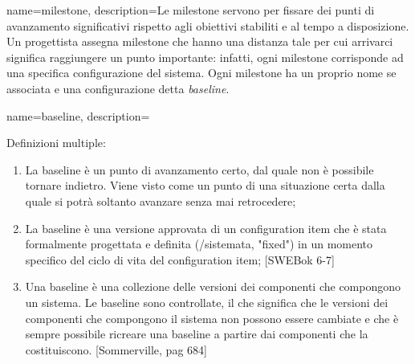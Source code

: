

{
name=milestone,
description={Le milestone servono per fissare dei punti di avanzamento significativi rispetto agli obiettivi stabiliti e al tempo a disposizione.
Un progettista assegna milestone che hanno una distanza tale per cui arrivarci significa raggiungere un punto importante: infatti, ogni milestone corrisponde ad una specifica configurazione del sistema.
Ogni milestone ha un proprio nome se associata e una configurazione detta \textit{baseline}.}
}

{
name=baseline,
description={Definizioni multiple:
\begin{enumerate}
\item La baseline \`e un punto di avanzamento certo, dal quale non è possibile tornare indietro. Viene visto come un punto di una situazione certa dalla quale si potr\`a soltanto avanzare senza mai retrocedere;
\item La baseline \`e una versione approvata di un configuration item che \`e stata formalmente progettata e definita (/sistemata, "fixed") in un momento specifico del ciclo di vita del configuration item; [SWEBok 6-7]
\item Una baseline \`e una collezione delle versioni dei componenti che compongono un sistema. Le baseline sono controllate, il che significa che le versioni dei componenti che compongono il sistema non possono essere cambiate e che \`e sempre possibile ricreare una baseline a partire dai componenti che la costituiscono. [Sommerville, pag 684]
\end{enumerate}
}
}


